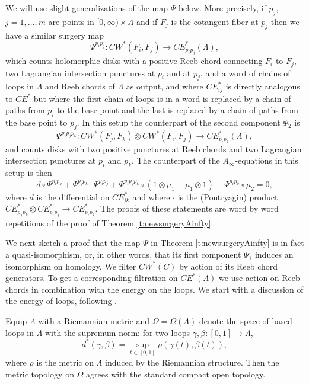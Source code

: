 \documentclass{gtpart}
\begin{document}
We will use slight generalizations of the map $\Psi$ below. More precisely, if $p_{j}$, $j=1,\dots,m$ are points in $[0,\infty)\times\Lambda$ and if $F_{j}$ is the cotangent fiber at $p_{j}$ then we have a similar surgery map
\[ 
\Psi^{p_ip_j}\colon CW^{\ast}(F_{i},F_{j})\to  CE^{\ast}_{p_ip_j}(\Lambda),
\]
which counts holomorphic disks with a positive Reeb chord connecting $F_{i}$ to $F_{j}$, two
Lagrangian intersection punctures at $p_{i}$ and at $p_{j}$, and a word of chains of loops in
$\Lambda$ and Reeb chords of $\Lambda$ as output, and where $CE^{\ast}_{ij}$ is directly analogous
to $CE^{\ast}$ but where the first chain of loops is in a word is replaced by a chain of paths from
$p_{i}$ to the base point and the last is replaced by a chain of paths from the base point to $p_{j}$.
In this setup the counterpart of the second component $\Psi_{2}$ is
\begin{equation}\label{eq:morefibersmap}
\Psi^{p_ip_jp_k}\colon CW^{\ast}(F_{j},F_{k})\otimes CW^{\ast}(F_{i},F_{j})\to CE^{\ast}_{p_ip_k}(\Lambda),
\end{equation}
and counts disks with two positive punctures at Reeb chords and two Lagrangian intersection punctures at $p_{i}$ and $p_{k}$. The counterpart of the $A_{\infty}$-equations in this setup is then
\begin{equation}\label{eq:morefibersprod} 
d\circ\Psi^{p_ip_k}+ \Psi^{p_jp_k}\cdot\Psi^{p_i p_j} + \Psi^{p_ip_jp_k}\circ(1\otimes\mu_{1}+\mu_{1}\otimes 1) + \Psi^{p_ip_k}\circ\mu_{2}=0, 
\end{equation}
where $d$ is the differential on $CE^{\ast}_{ik}$ and where $\cdot$ is the (Pontryagin) product
$CE^{\ast}_{p_j p_k}\otimes CE^{\ast}_{p_i p_j}\to CE^{\ast}_{p_ip_k}$. The proofs of these statements are word by word repetitions of the proof of Theorem \ref{t:newsurgeryAinfty}.


We next sketch a proof that the map $\Psi$ in Theorem \ref{t:newsurgeryAinfty} is in fact a
quasi-isomorphism, or, in other words, that its first component $\Psi_{1}$ induces an isomorphism on
homology. We filter $CW^{\ast}(C)$ by
action of its Reeb chord generators. To get a corresponding filtration on $CE^{\ast}(\Lambda)$ we
use action on Reeb chords in combination with the energy on the loops. We start with a discussion of the energy of loops, following \cite{Milnor}.

Equip $\Lambda$ with a Riemannian metric and  $\Omega=\Omega(\Lambda)$ denote the space of based loops in $\Lambda$ with the supremum norm: for two loops $\gamma,\beta\colon[0,1]\to \Lambda$,
\[
d^{\ast}(\gamma,\beta)=\sup_{t\in[0,1]} \rho(\gamma(t),\beta(t)),
\] 
where $\rho$ is the metric on $\Lambda$ induced by the Riemannian structure. Then the metric topology on $\Omega$ agrees with the standard compact open topology. 
\end{document}
